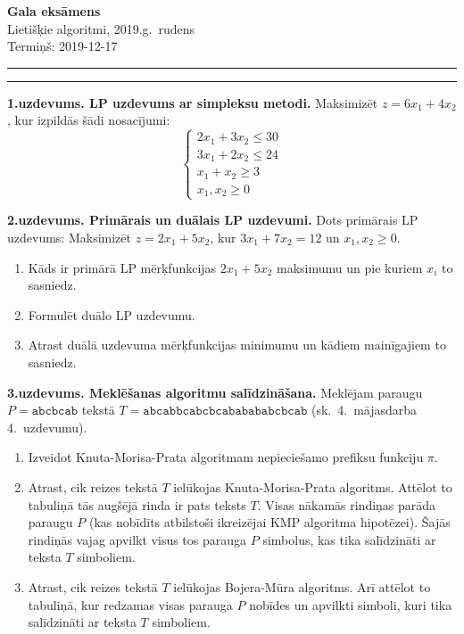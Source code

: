 \documentclass[a4paper,12pt]{article}
\begin{document}
\thispagestyle{empty}

\begin{center}
{\bf\Huge Gala eksāmens} \\[5pt]
Lietišķie algoritmi, 2019.g.\ rudens\\
Termiņš: 2019-12-17
\end{center}

\hrule
\vspace{2pt}
\hrule
\vspace{12pt}


\noindent
{\bf 1.uzdevums. LP uzdevums ar simpleksu metodi.}  
Maksimizēt $z = 6x_1 + 4x_2$, kur izpildās šādi nosacījumi:
$$\left\{ \begin{array}{l}
2x_1 + 3x_2 \leq 30\\
3x_1 + 2x_2 \leq 24\\
x_1 + x_2 \geq 3\\
x_1,x_2 \geq 0
\end{array} \right.$$

\vspace{6pt}
{\bf 2.uzdevums. Primārais un duālais LP uzdevumi.}
Dots primārais LP uzdevums: Maksimizēt $z = 2 x_1 + 5 x_2$, 
kur $3 x_1 + 7x_2  = 12$ un $x_1, x_2 \geq 0$. 
\begin{enumerate}
\item Kāds ir primārā LP mērķfunkcijas $2x_1 + 5x_2$ maksimumu un pie kuriem $x_i$ to sasniedz.
\item Formulēt duālo LP uzdevumu. 
\item Atrast duālā uzdevuma mērķfunkcijas minimumu un kādiem mainīgajiem to sasniedz.
\end{enumerate}


\vspace{6pt}
{\bf 3.uzdevums. Meklēšanas algoritmu salīdzināšana.} Meklējam paraugu $P = \mathtt{abcbcab}$
tekstā $T = \mathtt{abcabbcabcbcababababcbcab}$ (sk.\ 4.\ mājasdarba 4.\ uzdevumu). 
\begin{enumerate}
\item Izveidot Knuta-Morisa-Prata algoritmam nepieciešamo prefiksu funkciju $\pi$. 
\item Atrast, cik reizes tekstā $T$ ielūkojas
Knuta-Morisa-Prata algoritms. Attēlot to tabuliņā \textendash{} 
tās augšējā rinda ir pats teksts $T$. 
Visas nākamās rindiņas parāda paraugu $P$ (kas nobīdīts
atbilstoši ikreizējai KMP algoritma hipotēzei). 
Šajās rindiņās vajag apvilkt visus tos parauga $P$ 
simbolus, kas tika salīdzināti ar teksta $T$ simboliem. 
\item Atrast, cik reizes tekstā $T$ ielūkojas
Bojera-Mūra algoritms. Arī attēlot to tabuliņā, kur 
redzamas visas parauga $P$ nobīdes un apvilkti simboli, 
kuri tika salīdzināti ar teksta $T$ simboliem. 
\end{enumerate}
\end{document}

